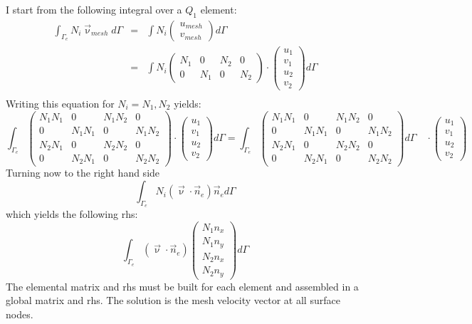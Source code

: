 I start from the following integral over a $Q_1$ element:
\begin{eqnarray}
\int_{\Gamma_e} N_i \vec{\upnu}_{mesh} d\Gamma
&=& \int N_i \left( \begin{array}{c} u_{mesh} \\ v_{mesh} \end{array} \right) d\Gamma \\
&=& \int N_i 
\left( \begin{array}{cccc}  N_1 & 0 & N_2 & 0 \\ 0 & N_1 & 0 & N_2  \end{array}\right)\cdot
\left( \begin{array}{c} u_1 \\ v_1 \\ u_2 \\ v_2 \end{array} \right) d\Gamma \\
\end{eqnarray}
Writing this equation for $N_i=N_1,N_2$ yields:
\[
\int_{\Gamma_e} 
\left( \begin{array}{cccc}  
N_1N_1 & 0 & N_1N_2 & 0 \\ 
0 & N_1N_1 & 0 & N_1N_2 \\
N_2N_1 & 0 & N_2N_2 & 0 \\ 
0 & N_2N_1 & 0 & N_2N_2 
\end{array}\right)
\cdot \left( \begin{array}{c} u_1 \\ v_1 \\ u_2 \\ v_2 \end{array} \right) 
d\Gamma 
=
\int_{\Gamma_e} 
\left( \begin{array}{cccc}  
N_1N_1 & 0 & N_1N_2 & 0 \\ 
0 & N_1N_1 & 0 & N_1N_2 \\
N_2N_1 & 0 & N_2N_2 & 0 \\ 
0 & N_2N_1 & 0 & N_2N_2 
\end{array}\right)
d\Gamma \quad 
\cdot \left( \begin{array}{c} u_1 \\ v_1 \\ u_2 \\ v_2 \end{array} \right) 
\]
Turning now to the right hand side %
\[
\int_{\Gamma_e} N_i   (\vec{\upnu}\cdot\vec{n}_e)\vec{n}_e  d\Gamma
\]
which yields the following rhs:
\[
\int_{\Gamma_e}   (\vec{\upnu}\cdot\vec{n}_e)
\left(\begin{array}{c}
N_1 n_x \\ N_1 n_y \\ N_2 n_x \\ N_2 n_y
\end{array}\right)
 d\Gamma
\]
The elemental matrix and rhs must be built for each element and assembled in a 
global matrix and rhs. The solution is the mesh velocity vector at all surface nodes.

